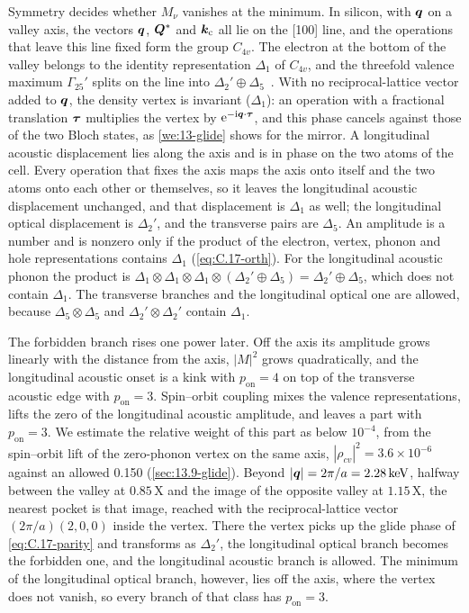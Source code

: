 Symmetry decides whether $M_\nu$ vanishes at the minimum. In silicon, with $\bm{q}$ on a valley axis, the vectors $\bm{q}$, $\bm{Q}^*$ and $\bm{k}_{\mathrm{c}}$ all lie on the [100] line, and the operations that leave this line fixed form the group $C_{4v}$. The electron at the bottom of the valley belongs to the identity representation $\Delta_1$ of $C_{4v}$, and the threefold valence maximum $\Gamma_{25}'$ splits on the line into $\Delta_2' \oplus \Delta_5$~\cite[Chap.~2]{yu2010fundamentals}. With no reciprocal-lattice vector added to $\bm{q}$, the density vertex is invariant ($\Delta_1$): an operation with a fractional translation $\bm{\tau}$ multiplies the vertex by $\mathrm{e}^{-\mathrm{i}\bm{q}\cdot\bm{\tau}}$, and this phase cancels against those of the two Bloch states, as \cref{we:13-glide} shows for the mirror. A longitudinal acoustic displacement lies along the axis and is in phase on the two atoms of the cell. Every operation that fixes the axis maps the axis onto itself and the two atoms onto each other or themselves, so it leaves the longitudinal acoustic displacement unchanged, and that displacement is $\Delta_1$ as well; the longitudinal optical displacement is $\Delta_2'$, and the transverse pairs are $\Delta_5$. An amplitude is a number and is nonzero only if the product of the electron, vertex, phonon and hole representations contains $\Delta_1$ (\cref{eq:C.17-orth}). For the longitudinal acoustic phonon the product is $\Delta_1\otimes\Delta_1\otimes\Delta_1\otimes(\Delta_2' \oplus \Delta_5) = \Delta_2' \oplus \Delta_5$, which does not contain $\Delta_1$. The transverse branches and the longitudinal optical one are allowed, because $\Delta_5\otimes\Delta_5$ and $\Delta_2'\otimes\Delta_2'$ contain $\Delta_1$.

The forbidden branch rises one power later. Off the axis its amplitude grows linearly with the distance from the axis, $|M|^2$ grows quadratically, and the longitudinal acoustic onset is a kink with $p_{\mathrm{on}} = 4$ on top of the transverse acoustic edge with $p_{\mathrm{on}} = 3$. Spin--orbit coupling mixes the valence representations, lifts the zero of the longitudinal acoustic amplitude, and leaves a part with $p_{\mathrm{on}} = 3$. We estimate the relative weight of this part as below $10^{-4}$, from the spin--orbit lift of the zero-phonon vertex on the same axis, $|\rho_{cv}|^2 = 3.6\times10^{-6}$ against an allowed 0.150 (\cref{sec:13.9-glide}). Beyond $|\bm{q}| = 2\pi/a = \SI{2.28}{keV}$, halfway between the valley at $0.85\,\mathrm{X}$ and the image of the opposite valley at $1.15\,\mathrm{X}$, the nearest pocket is that image, reached with the reciprocal-lattice vector $(2\pi/a)(2,0,0)$ inside the vertex. There the vertex picks up the glide phase of \cref{eq:C.17-parity} and transforms as $\Delta_2'$, the longitudinal optical branch becomes the forbidden one, and the longitudinal acoustic branch is allowed. The minimum of the longitudinal optical branch, however, lies off the axis, where the vertex does not vanish, so every branch of that class has $p_{\mathrm{on}} = 3$.

